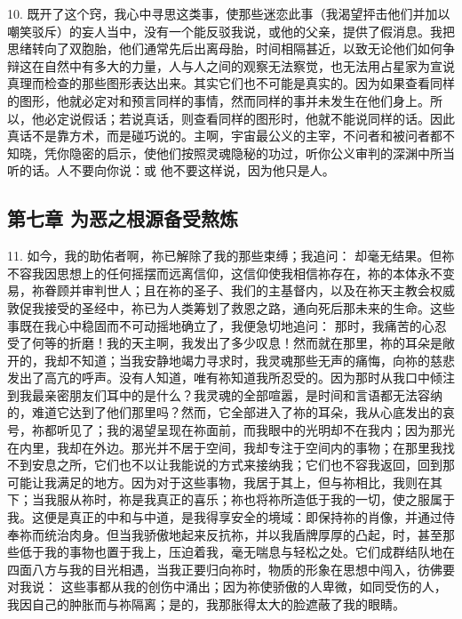 10. 既开了这个窍，我心中寻思这类事，使那些迷恋此事（我渴望抨击他们并加以嘲笑驳斥）的妄人当中，没有一个能反驳我说，或他的父亲，提供了假消息。我把思绪转向了双胞胎，他们通常先后出离母胎，时间相隔甚近，以致无论他们如何争辩这在自然中有多大的力量，人与人之间的观察无法察觉，也无法用占星家为宣说真理而检查的那些图形表达出来。其实它们也不可能是真实的。因为如果查看同样的图形，他就必定对和预言同样的事情，然而同样的事并未发生在他们身上。所以，他必定说假话；若说真话，则查看同样的图形时，他就不能说同样的话。因此真话不是靠方术，而是碰巧说的。主啊，宇宙最公义的主宰，不问者和被问者都不知晓，凭你隐密的启示，使他们按照灵魂隐秘的功过，听你公义审判的深渊中所当听的话。人不要向你说：或 他不要这样说，因为他只是人。\par


\subsection{第七章 为恶之根源备受熬炼}

11. 如今，我的助佑者啊，祢已解除了我的那些束缚；我追问： 却毫无结果。但祢不容我因思想上的任何摇摆而远离信仰，这信仰使我相信祢存在，祢的本体永不变易，祢眷顾并审判世人；且在祢的圣子、我们的主基督内，以及在祢天主教会权威敦促我接受的圣经中，祢已为人类筹划了救恩之路，通向死后那未来的生命。这些事既在我心中稳固而不可动摇地确立了，我便急切地追问： 那时，我痛苦的心忍受了何等的折磨！我的天主啊，我发出了多少叹息！然而就在那里，祢的耳朵是敞开的，我却不知道；当我安静地竭力寻求时，我灵魂那些无声的痛悔，向祢的慈悲发出了高亢的呼声。没有人知道，唯有祢知道我所忍受的。因为那时从我口中倾注到我最亲密朋友们耳中的是什么？我灵魂的全部喧嚣，是时间和言语都无法容纳的，难道它达到了他们那里吗？然而，它全部进入了祢的耳朵，我从心底发出的哀号，祢都听见了；我的渴望呈现在祢面前，而我眼中的光明却不在我内；因为那光在内里，我却在外边。那光并不居于空间，我却专注于空间内的事物；在那里我找不到安息之所，它们也不以让我能说的方式来接纳我；它们也不容我返回，回到那可能让我满足的地方。因为对于这些事物，我居于其上，但与祢相比，我则在其下；当我服从祢时，祢是我真正的喜乐；祢也将祢所造低于我的一切，使之服属于我。这便是真正的中和与中道，是我得享安全的境域：即保持祢的肖像，并通过侍奉祢而统治肉身。但当我骄傲地起来反抗祢，并以我盾牌厚厚的凸起，时，甚至那些低于我的事物也置于我上，压迫着我，毫无喘息与轻松之处。它们成群结队地在四面八方与我的目光相遇，当我正要归向祢时，物质的形象在思想中闯入，彷佛要对我说： 这些事都从我的创伤中涌出；因为祢使骄傲的人卑微，如同受伤的人，我因自己的肿胀而与祢隔离；是的，我那胀得太大的脸遮蔽了我的眼睛。\par

